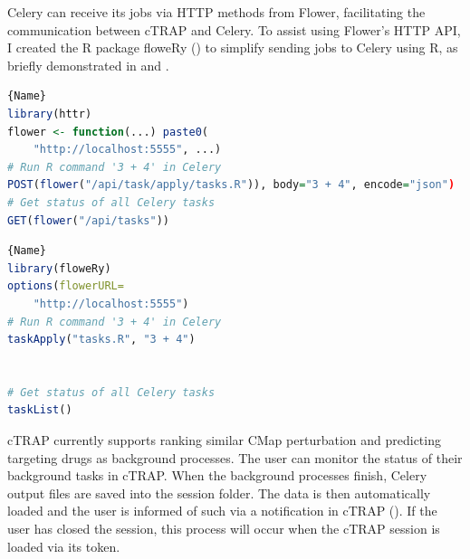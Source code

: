 Celery can receive its jobs via HTTP methods from Flower, facilitating the communication between cTRAP and Celery. To assist using Flower's HTTP API, I created the R package floweRy () to simplify sending jobs to Celery using R, as briefly demonstrated in  and .

\noindent\begin{minipage}{.48\textwidth}
\begin{lstlisting}[caption=Using plain \texttt{httr}.,language=R,label={lst:httr}]{Name}
library(httr)
flower <- function(...) paste0(
    "http://localhost:5555", ...)
# Run R command '3 + 4' in Celery
POST(flower("/api/task/apply/tasks.R")), body="3 + 4", encode="json")
# Get status of all Celery tasks
GET(flower("/api/tasks"))
\end{lstlisting}
\end{minipage}\hfill
\begin{minipage}{.48\textwidth}
\begin{lstlisting}[caption=Using \texttt{floweRy}.,language=R,label={lst:floweRy}]{Name}
library(floweRy)
options(flowerURL=
    "http://localhost:5555")
# Run R command '3 + 4' in Celery
taskApply("tasks.R", "3 + 4")


# Get status of all Celery tasks
taskList()
\end{lstlisting}
\end{minipage}

cTRAP currently supports ranking similar CMap perturbation and predicting targeting drugs as background processes. The user can monitor the status of their background tasks in cTRAP. When the background processes finish, Celery output files are saved into the session folder. The data is then automatically loaded and the user is informed of such via a notification in cTRAP (). If the user has closed the session, this process will occur when the cTRAP session is loaded via its token.

